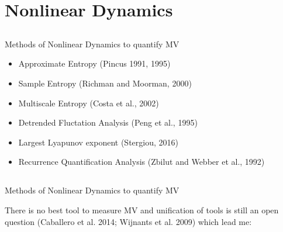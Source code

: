 \section{Nonlinear Dynamics}

\subsection{}
{
{
\begin{frame}{Methods of Nonlinear Dynamics to quantify MV}


\begin{itemize}
	\item Approximate Entropy (Pincus 1991, 1995)
	\item Sample Entropy (Richman and Moorman, 2000)
	\item Multiscale Entropy (Costa et al., 2002)
	\item Detrended Fluctation Analysis (Peng et al., 1995)
	\item Largest Lyapunov exponent (Stergiou, 2016)
	\item Recurrence Quantification Analysis (Zbilut and Webber et al., 1992)

\end{itemize}

\end{frame}
}



\subsection{}
{
{
\begin{frame}{Methods of Nonlinear Dynamics to quantify MV}


There is no best tool to measure MV and unification of tools is still
an open question (Caballero et al. 2014; Wijnants et al. 2009)
which lead me:


\end{frame}}}}
